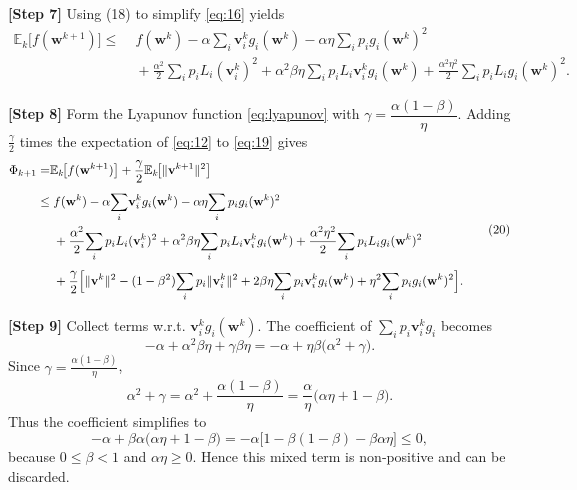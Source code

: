 \documentclass[11pt]{article}
\newcommand{\E}{\mathbb{E}}
\begin{document}
\noindent\textbf{[Step 7]}   Using (18) to simplify \eqref{eq:16} yields
\[
\begin{aligned}
\E_{k}\!\bigl[f(\mathbf w^{k+1})\bigr]
\le &\; f(\mathbf w^{k})
   -\alpha\!\sum_{i}\!\mathbf v^{k}_{i} g_i(\mathbf w^{k})
   -\alpha\eta\!\sum_{i}p_i g_i(\mathbf w^{k})^{2}\\
   &\;+\frac{\alpha^{2}}{2}\!\sum_{i}p_i L_i(\mathbf v^{k}_{i})^{2}
   +\alpha^{2}\beta\eta\!\sum_{i}p_i L_i \mathbf v^{k}_{i} g_i(\mathbf w^{k})
   +\frac{\alpha^{2}\eta^{2}}{2}\!\sum_{i}p_i L_i g_i(\mathbf w^{k})^{2}.
\end{aligned}
\tag{19}
\]

\noindent\textbf{[Step 8]}   Form the Lyapunov function \eqref{eq:lyapunov}
with $\gamma=\dfrac{\alpha(1-\beta)}{\eta}$.  Adding $\frac{\gamma}{2}$ times
the expectation of \eqref{eq:12} to \eqref{eq:19} gives
\[
\begin{aligned}
\Phi_{k+1}
=&\E_{k}\!\bigl[f(\mathbf w^{k+1})\bigr]
   +\frac{\gamma}{2}\E_{k}\!\bigl[\|\mathbf v^{k+1}\|^{2}\bigr]\\[4pt]
\le &\; f(\mathbf w^{k})
   -\alpha\!\sum_{i}\!\mathbf v^{k}_{i} g_i(\mathbf w^{k})
   -\alpha\eta\!\sum_{i}p_i g_i(\mathbf w^{k})^{2}\\
   &\;+\frac{\alpha^{2}}{2}\!\sum_{i}p_i L_i(\mathbf v^{k}_{i})^{2}
   +\alpha^{2}\beta\eta\!\sum_{i}p_i L_i \mathbf v^{k}_{i} g_i(\mathbf w^{k})
   +\frac{\alpha^{2}\eta^{2}}{2}\!\sum_{i}p_i L_i g_i(\mathbf w^{k})^{2}\\[4pt]
   &\;+\frac{\gamma}{2}\Bigl[
      \|\mathbf v^{k}\|^{2}
      -(1-\beta^{2})\!\sum_{i}p_i\|\mathbf v^{k}_{i}\|^{2}
      +2\beta\eta\!\sum_{i}p_i\mathbf v^{k}_{i} g_i(\mathbf w^{k})
      +\eta^{2}\!\sum_{i}p_i g_i(\mathbf w^{k})^{2}
   \Bigr].
\end{aligned}
\tag{20}
\]

\noindent\textbf{[Step 9]}   Collect terms w.r.t. $\mathbf v^{k}_{i}g_i(\mathbf w^{k})$.
The coefficient of $\sum_i p_i \mathbf v^{k}_{i} g_i$ becomes
\[
-\alpha +\alpha^{2}\beta\eta +\gamma\beta\eta
= -\alpha +\eta\beta\bigl(\alpha^{2}+\gamma\bigr).
\]
Since $\gamma=\frac{\alpha(1-\beta)}{\eta}$,
\[
\alpha^{2}+\gamma
= \alpha^{2}+ \frac{\alpha(1-\beta)}{\eta}
= \frac{\alpha}{\eta}\bigl(\alpha\eta+1-\beta\bigr).
\]
Thus the coefficient simplifies to
\[
-\alpha +\beta\alpha\bigl(\alpha\eta+1-\beta\bigr)
= -\alpha\bigl[1-\beta(1-\beta)-\beta\alpha\eta\bigr]
\le 0,
\]
because $0\le\beta<1$ and $\alpha\eta\ge0$.  Hence this mixed term is
non‑positive and can be discarded.
\end{document}
